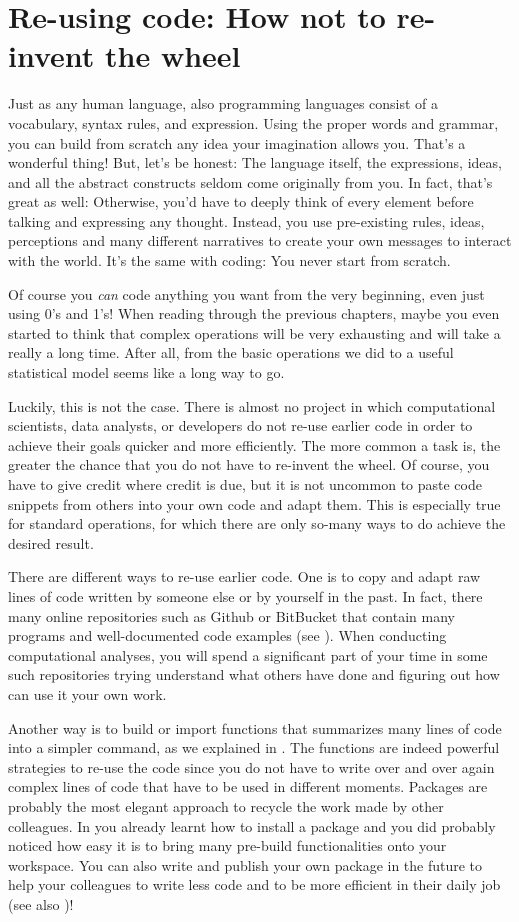 \section{Re-using code: How not to re-invent the wheel}
\label{sec:code}

Just as any human language, also programming languages consist of a vocabulary, syntax rules, and expression. Using the proper words and grammar, you can build from scratch any idea your imagination allows you. That's a wonderful thing! But, let's be honest: The language itself, the expressions, ideas, and all the abstract constructs seldom come originally from you. In fact, that's great as well: Otherwise, you'd have to deeply think of every element before talking and expressing any thought. Instead, you use pre-existing rules, ideas, perceptions and many different narratives to create your own messages to interact with the world. It's the same with coding: You never start from scratch.

Of course you \emph{can} code anything you want from the very beginning, even just using 0's and 1's!
When reading through the previous chapters, maybe you even started to think that complex operations will be very exhausting and will take a really a long time. After all, from the basic operations we did to a useful statistical model seems like a long way to go.

Luckily, this is not the case.
There is almost no project in which computational scientists, data analysts, or developers do not re-use earlier code in order to achieve their goals quicker and more efficiently.
The more common a task is, the greater the chance that you do not have to re-invent the wheel.
Of course, you have to give credit where credit is due, but it is not uncommon to paste code snippets from others into your own code and adapt them. This is especially true for standard operations, for which there are only so-many ways to do achieve the desired result.

There are different ways to re-use earlier code. One is to copy and adapt raw lines of code written by someone else or by yourself in the past. In fact, there many online repositories such as Github or BitBucket that contain many programs and well-documented code examples (see ). When conducting computational analyses, you will spend a significant part of your time in some such repositories trying understand what others have done and figuring out how can use it your own work.

Another way is to build or import functions that summarizes many lines of code into a simpler command, as we explained in . The functions are indeed powerful strategies to re-use the code since you do not have to write over and over again complex lines of code that have to be used in different moments. Packages are probably the most elegant approach to recycle the work made by other colleagues. In  you already learnt how to install a package and you did probably noticed how easy it is to bring many pre-build functionalities onto your workspace. You can also write and publish your own package in the future to help your colleagues to write less code and to be more efficient in their daily job (see also )!

